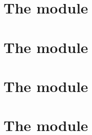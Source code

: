 

\chapter{The \shakiraMod{} module}   \label{chap: shakira data}        \minitoc 
\chapter{The \blkMdxMod{} module}    \label{chap: blake modexp data}   \minitoc 
\chapter{The \ecDataMod{} module}    \label{chap: ec data}             \minitoc 
\chapter{The \blsMod{} module}       \label{chap: bls data}            \minitoc 
